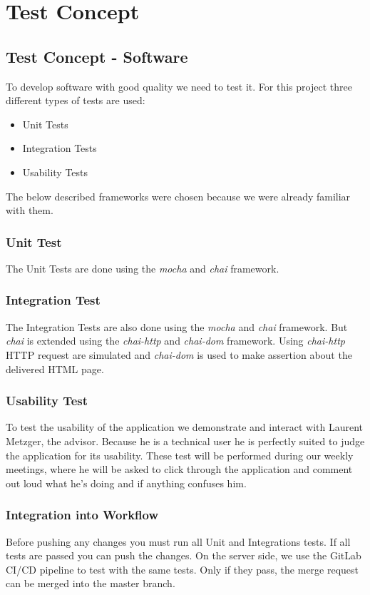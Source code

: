 \chapter{Test Concept}

\section{Test Concept - Software}
To develop software with good quality we need to test it.
For this project three different types of tests are used:

\begin{itemize}
  \item Unit Tests
  \item Integration Tests
  \item Usability Tests
\end{itemize}

The below described frameworks were chosen because we were already familiar with them.

\subsection{Unit Test}
The Unit Tests are done using the \textit{mocha} and \textit{chai} framework.

\subsection{Integration Test}
The Integration Tests are also done using the \textit{mocha} and \textit{chai} framework.
But \textit{chai} is extended using the \textit{chai-http} and \textit{chai-dom} framework.
Using \textit{chai-http} HTTP request are simulated and \textit{chai-dom} is used to make assertion about the delivered HTML page.

\subsection{Usability Test}
To test the usability of the application we demonstrate and interact with Laurent Metzger, the advisor.
Because he is a technical user he is perfectly suited to judge the application for its usability.
These test will be performed during our weekly meetings, where he will be asked to click through the application
and comment out loud what he's doing and if anything confuses him.

\subsection{Integration into Workflow}
Before pushing any changes you must run all Unit and Integrations tests.
If all tests are passed you can push the changes.
On the server side, we use the GitLab CI/CD pipeline to test with the same tests.
Only if they pass, the merge request can be merged into the master branch.

